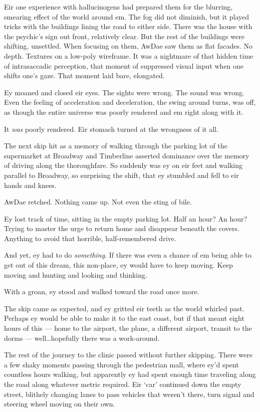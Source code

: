 Eir one experience with hallucinogens had prepared them for the blurring, smearing effect of the world around em. The fog did not diminish, but it played tricks with the buildings lining the road to either side. There was the house with the psychic's sign out front, relatively clear. But the rest of the buildings were shifting, unsettled. When focusing on them, AwDae saw them as flat facades. No depth. Textures on a low-poly wireframe. It was a nightmare of that hidden time of intrasaccadic perception, that moment of suppressed visual input when one shifts one's gaze. That moment laid bare, elongated.

Ey moaned and closed eir eyes. The sights were wrong. The sound was wrong. Even the feeling of acceleration and deceleration, the swing around turns, was off, as though the entire universe was poorly rendered and em right along with it.

It \emph{was} poorly rendered. Eir stomach turned at the wrongness of it all.

The next skip hit as a memory of walking through the parking lot of the supermarket at Broadway and Timberline asserted dominance over the memory of driving along the thoroughfare. So suddenly was ey on eir feet and walking parallel to Broadway, so surprising the shift, that ey stumbled and fell to eir hands and knees.

AwDae retched. Nothing came up. Not even the sting of bile.

Ey lost track of time, sitting in the empty parking lot. Half an hour? An hour? Trying to master the urge to return home and disappear beneath the covers. Anything to avoid that horrible, half-remembered drive.

And yet, ey had to do \emph{something}. If there was even a chance of em being able to get out of this dream, this non-place, ey would have to keep moving. Keep moving and hunting and looking and thinking.

With a groan, ey stood and walked toward the road once more.

The skip came as expected, and ey gritted eir teeth as the world whirled past. Perhaps ey would be able to make it to the east coast, but if that meant eight hours of this — home to the airport, the plane, a different airport, transit to the dorms — well\ldots{}hopefully there was a work-around.

The rest of the journey to the clinic passed without further skipping. There were a few shaky moments passing through the pedestrian mall, where ey'd spent countless hours walking, but apparently ey had spent enough time traveling along the road along whatever metric required. Eir `car' continued down the empty street, blithely changing lanes to pass vehicles that weren't there, turn signal and steering wheel moving on their own.

